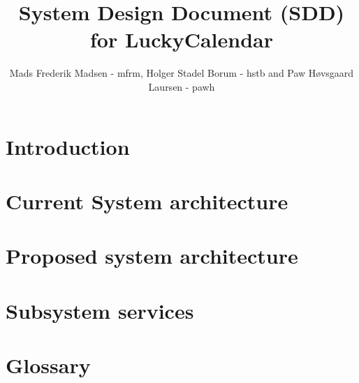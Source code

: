 \documentclass{article}
\begin{document}
\title{System Design Document (SDD) for LuckyCalendar}
\author{Mads Frederik Madsen - mfrm, Holger Stadel Borum - hstb and Paw H\o vsgaard Laursen - pawh}
\maketitle
\tableofcontents
\newpage

\section{Introduction}
	
	\newpage

\section{Current System architecture}
	
	\newpage

\section{Proposed system architecture}
	
	\newpage

\section{Subsystem services}
	
	\newpage
\section{Glossary}
\end{document}
